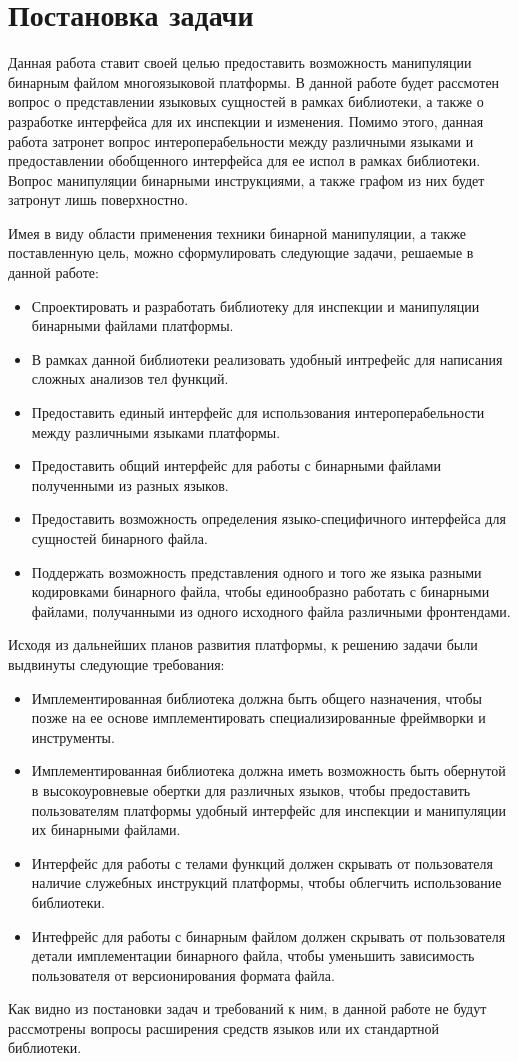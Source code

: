\section{Постановка задачи}
\label{sec:Chapter1} 

Данная работа ставит своей целью предоставить возможность манипуляции бинарным файлом многоязыковой платформы. В данной работе будет рассмотен вопрос о представлении языковых сущностей в рамках библиотеки, а также о разработке интерфейса для их инспекции и изменения. Помимо этого, данная работа затронет вопрос интероперабельности между различными языками и предоставлении обобщенного интерфейса для ее испол в рамках библиотеки. Вопрос манипуляции бинарными инструкциями, а также графом из них будет затронут лишь поверхностно.

Имея в виду области применения техники бинарной манипуляции, а также поставленную цель, можно сформулировать следующие задачи, решаемые в данной работе:

\begin{itemize}
    \item Спроектировать и разработать библиотеку для инспекции и манипуляции бинарными файлами платформы.
    \item В рамках данной библиотеки реализовать удобный интрефейс для написания сложных анализов тел функций.
    \item Предоставить единый интерфейс для использования интероперабельности между различными языками платформы.
    \item Предоставить общий интерфейс для работы с бинарными файлами полученными из разных языков.
    \item Предоставить возможность определения языко-специфичного интерфейса для сущностей бинарного файла.
    \item Поддержать возможность представления одного и того же языка разными кодировками бинарного файла, чтобы единообразно работать с бинарными файлами, получанными из одного исходного файла различными фронтендами.
\end{itemize}

Исходя из дальнейших планов развития платформы, к решению задачи были выдвинуты следующие требования:

\begin{itemize}
    \item Имплементированная библиотека должна быть общего назначения, чтобы позже на ее основе имплементировать специализированные фреймворки и инструменты.
    \item Имплементированная библиотека должна иметь возможность быть обернутой в высокоуровневые обертки для различных языков, чтобы предоставить пользователям платформы удобный интерфейс для инспекции и манипуляции их бинарными файлами.
    \item Интерфейс для работы с телами функций должен скрывать от пользователя наличие служебных инструкций платформы, чтобы облегчить использование библиотеки.
    \item Интефрейс для работы с бинарным файлом должен скрывать от пользователя детали имплементации бинарного файла, чтобы уменьшить зависимость пользователя от версионирования формата файла.
\end{itemize}

Как видно из постановки задач и требований к ним, в данной работе не будут рассмотрены вопросы расширения средств языков или их стандартной библиотеки.

\newpage
